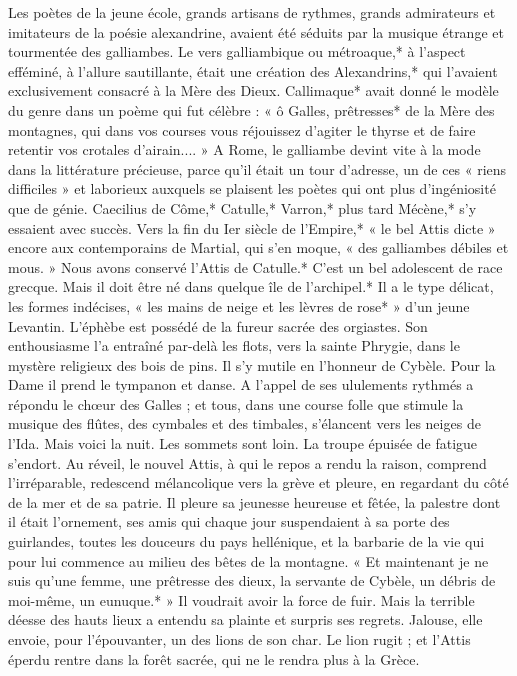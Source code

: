 \documentclass[a4paper, 11pt, oneside, polutonikogreek, french]{article}
\begin{document}
Les poètes de la jeune école, grands artisans de rythmes, grands admirateurs et imitateurs de la poésie alexandrine, avaient été séduits par la musique étrange et tourmentée des galliambes. Le vers galliambique ou métroaque,* à l'aspect efféminé, à l'allure sautillante, était une création des Alexandrins,* qui l'avaient exclusivement consacré à la Mère des Dieux. Callimaque* avait donné le modèle du genre dans un poème qui fut célèbre : « ô Galles, prêtresses* de la Mère des montagnes, qui dans vos courses vous réjouissez d'agiter le thyrse et de faire retentir vos crotales d'airain.... » A Rome, le galliambe devint vite à la mode dans la littérature précieuse, parce qu'il était un tour d'adresse, un de ces « riens difficiles » et laborieux auxquels se plaisent les poètes qui ont plus d'ingéniosité que de génie. Caecilius de Côme,* Catulle,* Varron,* plus tard Mécène,* s'y essaient avec succès. Vers la fin du Ier siècle de l'Empire,* « le bel Attis dicte » encore aux contemporains de Martial, qui s'en moque, « des galliambes débiles et mous. » Nous avons conservé l'Attis de Catulle.* C'est un bel adolescent de race grecque. Mais il doit être né dans quelque île de l'archipel.* Il a le type délicat, les formes indécises, « les mains de neige et les lèvres de rose* » d'un jeune Levantin. L'éphèbe est possédé de la fureur sacrée des orgiastes. Son enthousiasme l'a entraîné par-delà les flots, vers la sainte Phrygie, dans le mystère religieux des bois de pins. Il s'y mutile en l'honneur de Cybèle. Pour la Dame il prend le tympanon et danse. A l'appel de ses ululements rythmés a répondu le chœur des Galles ; et tous, dans une course folle que stimule la musique des flûtes, des cymbales et des timbales, s'élancent vers les neiges de l'Ida. Mais voici la nuit. Les sommets sont loin. La troupe épuisée de fatigue s'endort. Au réveil, le nouvel Attis, à qui le repos a rendu la raison, comprend l'irréparable, redescend mélancolique vers la grève et pleure, en regardant du côté de la mer et de sa patrie. Il pleure sa jeunesse heureuse et fêtée, la palestre dont il était l'ornement, ses amis qui chaque jour suspendaient à sa porte des guirlandes, toutes les douceurs du pays hellénique, et la barbarie de la vie qui pour lui commence au milieu des bêtes de la montagne. « Et maintenant je ne suis qu'une femme, une prêtresse des dieux, la servante de Cybèle, un débris de moi-même, un eunuque.* » Il voudrait avoir la force de fuir. Mais la terrible déesse des hauts lieux a entendu sa plainte et surpris ses regrets. Jalouse, elle envoie, pour l'épouvanter, un des lions de son char. Le lion rugit ; et l'Attis éperdu rentre dans la forêt sacrée, qui ne le rendra plus à la Grèce.
\end{document}
